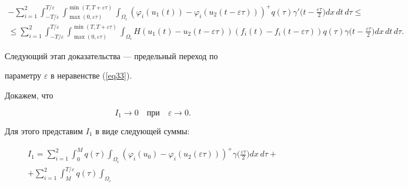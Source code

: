 \begin{pf}
\begin{multline}
%


-\sum_{i=1}^{2} \int_{- T / \varepsilon}^{T / \varepsilon} 


\int_{\max (0, \varepsilon \tau)}^{\min (T, T+\varepsilon \tau)} 


\int_{\Omega_{i}} 


({\varphi_{i}(u_{1}(t))-\varphi_{i}(u_{2}(t-\varepsilon \tau))})^{+}


q(\tau){ \gamma}'\bigg(t-\frac{\varepsilon \tau}{2}\bigg)


dx\, dt\, d \tau \leq \\


%


\leq \sum_{i=1}^{2} \int_{- T / \varepsilon}^{T / \varepsilon} 


\int_{\max (0, \varepsilon \tau)}^{\min (T, T+\varepsilon \tau)} 


\int_{\Omega_{i}} H(u_{1}(t)-u_{2}(t-\varepsilon \tau))(f_{i}(t) -


f_{i}(t-\varepsilon \tau)) q(\tau) \gamma


\bigg(t-\frac{\varepsilon \tau}{2}\bigg) dx\, dt\, d \tau. 


\end{multline} 





Следующий этап доказательства --- предельный переход по 


параметру $\varepsilon$ в неравенстве (\ref{eq33}). 


Докажем, что 


$$


I_{1} \rightarrow 0\quad


\text{при}


\quad \varepsilon \rightarrow 0.


$$


Для этого представим $I_{1}$ в виде следующей суммы:


\begin{multline*}


I_{1}=\sum_{i=1}^{2} \int_{0}^{M} q(\tau) \int_{\Omega_{i}} 


({\varphi_{i}(u_{0})-\varphi_{i}(u_{2}(\varepsilon \tau))})^{+}


\gamma \bigg(\frac{\varepsilon \tau}{2}\bigg) dx\, d \tau+ \\


%


+\sum_{i=1}^{2} \int_{M}^{T / \varepsilon} q(\tau) \int_{\Omega_{i}} 



\end{multline*}
\end{pf}
